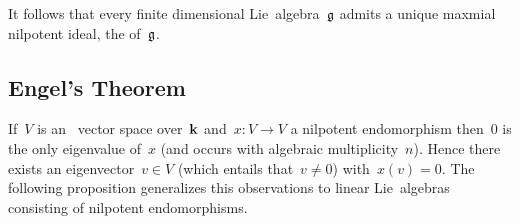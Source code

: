 \begin{remark}

  It follows that every finite dimensional Lie~algebra~$\mathfrak{g}$ admits a unique maxmial nilpotent ideal, the  of~$\mathfrak{g}$.
\end{remark}





\subsection{Engel’s Theorem}


\begin{remark}
  If~$V$ is an~{} vector space over~$\mathbf{k}$ and~$x \colon V \to V$ a nilpotent endomorphism then~$0$ is the only eigenvalue of~$x$ (and occurs with algebraic multiplicity~$n$).
  Hence there exists an eigenvector~$v \in V$ (which entails that~$v \neq 0$) with~$x(v) = 0$.
  The following proposition generalizes this observations to linear Lie~algebras consisting of nilpotent endomorphisms.
\end{remark}



